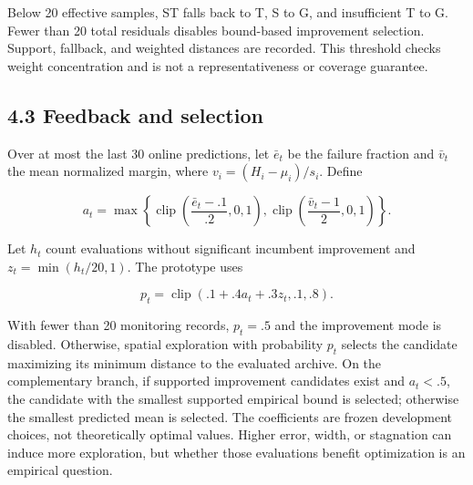 \documentclass[11pt,a4paper]{article}
\begin{document}
Below 20 effective samples, ST falls back to T, S to G, and insufficient
T to G. Fewer than 20 total residuals disables bound-based improvement
selection. Support, fallback, and weighted distances are recorded. This
threshold checks weight concentration and is not a representativeness or
coverage guarantee.

\par{}\noindent\begin{minipage}{\linewidth}

\hypertarget{feedback-and-selection}{%
\subsection{4.3 Feedback and selection}\label{feedback-and-selection}}

Over at most the last 30 online predictions, let \(\bar e_t\) be the
failure fraction and \(\bar v_t\) the mean normalized margin, where
\(v_i=(H_i-\mu_i)/s_i\). Define

\[a_t=\max\left\{\operatorname{clip}\left(\frac{\bar e_t-.1}{.2},0,1\right),\operatorname{clip}\left(\frac{\bar v_t-1}{2},0,1\right)\right\}.\]

\end{minipage}\par

\par\noindent\begin{minipage}{\linewidth}

Let \(h_t\) count evaluations without significant incumbent improvement
and \(z_t=\min(h_t/20,1)\). The prototype uses

\[p_t=\operatorname{clip}(.1+.4a_t+.3z_t,.1,.8).\]

\end{minipage}\par

With fewer than 20 monitoring records, \(p_t=.5\) and the improvement
mode is disabled. Otherwise, spatial exploration with probability
\(p_t\) selects the candidate maximizing its minimum distance to the
evaluated archive. On the complementary branch, if supported improvement
candidates exist and \(a_t<.5\), the candidate with the smallest
supported empirical bound is selected; otherwise the smallest predicted
mean is selected. The coefficients are frozen development choices, not
theoretically optimal values. Higher error, width, or stagnation can
induce more exploration, but whether those evaluations benefit
optimization is an empirical question.
\end{document}
